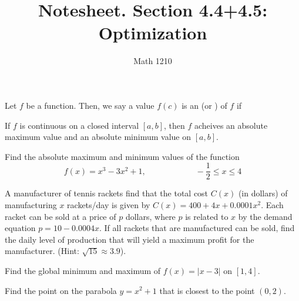 \documentclass[12pt, a4paper]{article}
\author{Math 1210}
\title{Notesheet. Section 4.4+4.5: Optimization}
\date{}
\begin{document}
\maketitle
\nameline
\begin{defi}
  Let \(f\) be a function. Then, we say a value \(f(c)\) is an
   (or ) of \(f\) if
\end{defi}
\begin{thrm}
  If \(f\) is continuous on a closed interval \([a,b]\), then \(f\)
  acheives an absolute maximum value and an absolute minimum value on
  \([a,b]\).
\end{thrm}
\vspace{-1in}
\begin{ex}
  Find the absolute maximum and minimum values of the function \[
    f(x) = x^3 - 3x^2 + 1, \hspace{1in} -\frac{1}{2} \leq x \leq 4
  \]
\end{ex}
\vspace{-0.75in}
\begin{ex}
  A manufacturer of tennis rackets find that the total cost \(C(x)\)
  (in dollars) of manufacturing \(x\) rackets/day is given by \(C(x) =
  400 + 4x + 0.0001x^2\). Each racket can be sold at a price of \(p\)
  dollars, where \(p\) is related to \(x\) by the demand equation \(p
  = 10 - 0.0004x\). If all rackets that are manufactured can be sold,
  find the daily level of production that will yield a maximum profit
  for the manufacturer. (Hint: \(\sqrt{15} \approx 3.9\)).
\end{ex}
\begin{ex}
  Find the global minimum and maximum of \(f(x) = |x-3|\) on
  \([1,4]\).
\end{ex}
\begin{ex}
  Find the point on the parabola \(y = x^2+1\) that is closest to the
  point \((0,2)\).
\end{ex}
\end{document}
